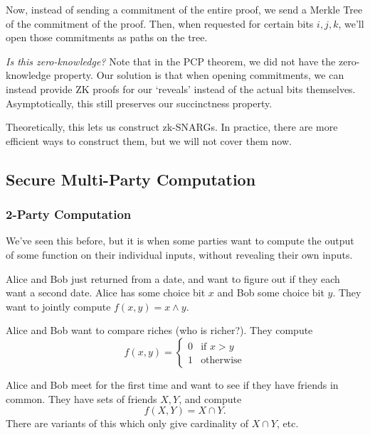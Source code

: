 Now, instead of sending a commitment of the entire proof, we send a Merkle Tree of the commitment of the proof. Then, when requested for certain bits $i, j, k$, we'll open those commitments as paths on the tree.

\emph{Is this zero-knowledge?} Note that in the PCP theorem, we did not have the zero-knowledge property. Our solution is that when opening commitments, we can instead provide ZK proofs for our `reveals' instead of the actual bits themselves. Asymptotically, this still preserves our succinctness property.

Theoretically, this lets us construct zk-SNARGs. In practice, there are more efficient ways to construct them, but we will not cover them now.

\subsection{Secure Multi-Party Computation}

\subsubsection{2-Party Computation}

We've seen this before, but it is when some parties want to compute the output of some function on their individual inputs, without revealing their own inputs.

\begin{example}
    Alice and Bob just returned from a date, and want to figure out if they each want a second date. Alice has some choice bit $x$ and Bob some choice bit $y$. They want to jointly compute $f(x, y) = x\land y$.
\end{example}
\begin{example}
    Alice and Bob want to compare riches (who is richer?). They compute
    \[f(x, y) = \begin{cases}
            0 & \text{if }x>y    \\
            1 & \text{otherwise}
        \end{cases}\]
\end{example}
\begin{example}
    Alice and Bob meet for the first time and want to see if they have friends in common. They have sets of friends $X,Y$, and compute
    \[f(X, Y) = X\cap Y.\]
    There are variants of this which only give cardinality of $X\cap Y$, etc.
\end{example}

